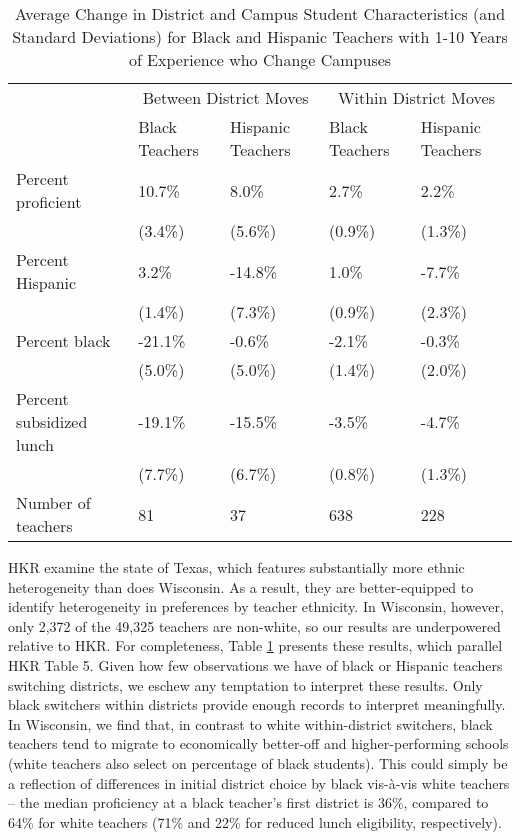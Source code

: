 \documentclass[12pt,]{article}
\begin{document}
\begin{table}[htbp]
\centering
\begin{tabular}{lp{}p{}p{}p{}}
  \hline
 & \multicolumn{2}{c}{Between District Moves} & \multicolumn{2}{c}{Within District Moves}\\ \cline{2-5}
 & Black Teachers & Hispanic Teachers & Black Teachers & Hispanic Teachers \\
  \hline
Percent proficient & 10.7\% & 8.0\% & 2.7\% & 2.2\% \\ 
   & (3.4\%) & (5.6\%) & (0.9\%) & (1.3\%) \\ 
  Percent Hispanic & 3.2\% & -14.8\% & 1.0\% & -7.7\% \\ 
   & (1.4\%) & (7.3\%) & (0.9\%) & (2.3\%) \\ 
  Percent black & -21.1\% & -0.6\% & -2.1\% & -0.3\% \\ 
   & (5.0\%) & (5.0\%) & (1.4\%) & (2.0\%) \\ 
  Percent subsidized lunch & -19.1\% & -15.5\% & -3.5\% & -4.7\% \\ 
   & (7.7\%) & (6.7\%) & (0.8\%) & (1.3\%) \\ 
  Number of teachers & 81 & 37 & 638 & 228 \\ 
   \hline
\end{tabular}
\caption{Average Change in District and Campus Student Characteristics (and Standard Deviations) for Black and Hispanic Teachers with 1-10 Years of Experience who Change Campuses} 
\label{tbl:change_by_eth}
\end{table}

HKR examine the state of Texas, which features substantially more ethnic
heterogeneity than does Wisconsin. As a result, they are better-equipped
to identify heterogeneity in preferences by teacher ethnicity. In
Wisconsin, however, only 2,372 of the 49,325 teachers are non-white, so
our results are underpowered relative to HKR. For completeness, Table
\ref{tbl:change_by_eth} presents these results, which parallel HKR Table
5. Given how few observations we have of black or Hispanic teachers
switching districts, we eschew any temptation to interpret these
results. Only black switchers within districts provide enough records to
interpret meaningfully. In Wisconsin, we find that, in contrast to white
within-district switchers, black teachers tend to migrate to
economically better-off and higher-performing schools (white teachers
also select on percentage of black students). This could simply be a
reflection of differences in initial district choice by black vis-à-vis
white teachers -- the median proficiency at a black teacher's first
district is 36\%, compared to 64\% for white teachers (71\% and 22\% for
reduced lunch eligibility, respectively).
\end{document}
